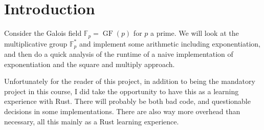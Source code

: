\section{Introduction}

Consider the Galois field $\mathbb{F}_p = \operatorname{GF}(p)$ for $p$ a prime. We will look at the multiplicative group $\mathbb{F}_p^*$ and implement some arithmetic including exponentiation, and then do a quick analysis of the runtime of a naive implementation of exponentiation and the square and multiply approach.

Unfortunately for the reader of this project, in addition to being the mandatory project in this course, I did take the opportunity to have this as a learning experience with Rust. There will probably be both bad code, and questionable decisions in some implementations. There are also way more overhead than necessary, all this mainly as a Rust learning experience.
